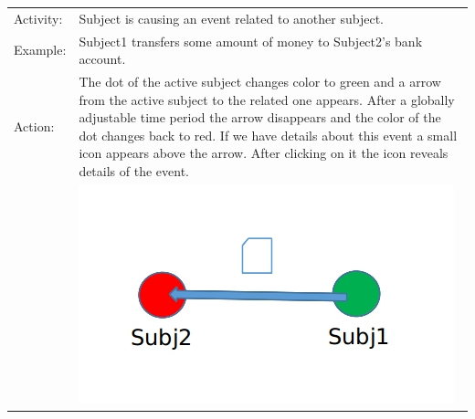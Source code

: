 \begin{tabularx}{\textwidth}{l X}
Activity: & Subject is causing an event related to another subject. \\
Example: & Subject1 transfers some amount of money to Subject2's bank account.\\
Action: & The dot of the active subject changes color to green and a arrow from the active subject to the related one appears. After a globally adjustable time period the arrow disappears and the color of the dot changes back to red. If we have details about this event a small icon appears above the arrow. After clicking on it the icon reveals details of the event. \\
& \includegraphics[scale=0.3]{./img/visualization/subj_sending_msg.png}\\


\end{tabularx}\\
